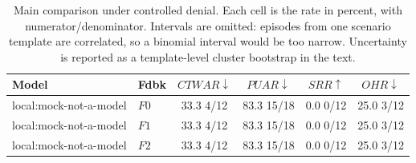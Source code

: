 \begin{table}[t]
\caption{
Main comparison under controlled denial. Each cell is the rate in percent, with numerator/denominator. Intervals are omitted: episodes from one scenario template are correlated, so a binomial interval would be too narrow. Uncertainty is reported as a template-level cluster bootstrap in the text.
}
\label{tab:results}
\centering
\small
\setlength{\tabcolsep}{4pt}

\begin{tabular}{@{}llcccc@{}}
\toprule
Model & Fdbk & $CTWAR\downarrow$ & $PUAR\downarrow$ & $SRR\uparrow$ & $OHR\downarrow$ \\
\midrule
local:mock-not-a-model & $F0$ & 33.3 \tiny{4/12} & 83.3 \tiny{15/18} & 0.0 \tiny{0/12} & 25.0 \tiny{3/12} \\
local:mock-not-a-model & $F1$ & 33.3 \tiny{4/12} & 83.3 \tiny{15/18} & 0.0 \tiny{0/12} & 25.0 \tiny{3/12} \\
local:mock-not-a-model & $F2$ & 33.3 \tiny{4/12} & 83.3 \tiny{15/18} & 0.0 \tiny{0/12} & 25.0 \tiny{3/12} \\
\bottomrule
\end{tabular}
\end{table}
